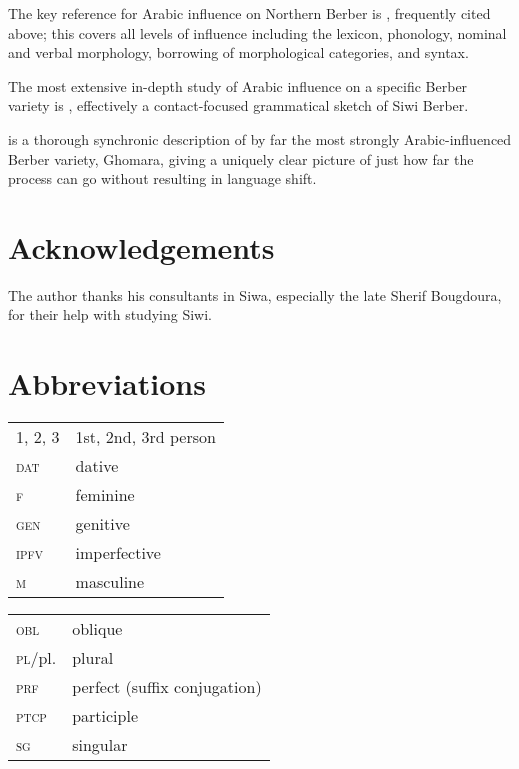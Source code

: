 \documentclass[output=paper]{langsci/langscibook}
\begin{document}
The key reference for Arabic influence on Northern Berber is \citet{Kossmann2012}, frequently cited above; this covers all levels of influence including the lexicon, phonology, nominal and verbal morphology, borrowing of morphological categories, and syntax.
\largerpage

The most extensive in-depth study of Arabic influence on a specific Berber variety is \citet{Souag2013book}, effectively a contact-focused grammatical sketch of Siwi Berber.

\citet{Mourigh2016} is a thorough synchronic description of by far the most strongly Arabic-influenced Berber variety, Ghomara, giving a uniquely clear picture of just how far the process can go without resulting in language shift.

\section*{Acknowledgements}

The author thanks his consultants in Siwa, especially the late Sherif Bougdoura, for their help with studying Siwi.

\section*{Abbreviations}
\begin{tabularx}{.5\textwidth}{@{}lQ@{}}
\textsc{1, 2, 3} & 1st, 2nd, 3rd person \\
\textsc{dat} & dative \\
\textsc{f} & feminine \\
\textsc{gen} & genitive \\
\textsc{ipfv} & imperfective  \\
\textsc{m} & masculine \\
\end{tabularx}%
\begin{tabularx}{.5\textwidth}{@{}lQ@{}}
\textsc{obl} & oblique \\
\textsc{pl}/pl. & plural \\
\textsc{prf} & perfect (suffix conjugation) \\
\textsc{ptcp} & participle \\
\textsc{sg} & singular \\
\end{tabularx}%
 

\sloppy
\printbibliography[heading=subbibliography,notkeyword=this]
\end{document}
